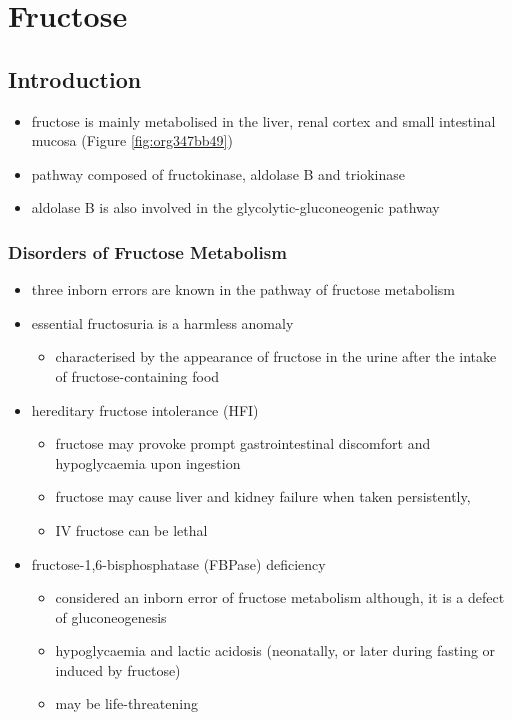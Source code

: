 \documentclass{scrartcl}
\begin{document}
\section{Fructose}
\label{sec:org1dc4e27}
\subsection{Introduction}
\label{sec:org7d9e7b2}
\begin{itemize}
\item fructose is mainly metabolised in the liver, renal cortex and small
intestinal mucosa (Figure \ref{fig:org347bb49})
\item pathway composed of fructokinase, aldolase B and triokinase
\item aldolase B is also involved in the glycolytic-gluconeogenic pathway
\end{itemize}

\subsubsection{Disorders of Fructose Metabolism}
\label{sec:orgfaa352c}
\begin{itemize}
\item three inborn errors are known in the pathway of fructose metabolism
\item essential fructosuria is a harmless anomaly
\begin{itemize}
\item characterised by the appearance of fructose in the urine after the
intake of fructose-containing food
\end{itemize}
\item hereditary fructose intolerance (HFI)
\begin{itemize}
\item fructose may provoke prompt gastrointestinal discomfort and hypoglycaemia upon ingestion
\item fructose may cause liver and kidney failure when taken persistently,
\item IV fructose can be lethal
\end{itemize}
\item fructose-1,6-bisphosphatase (FBPase) deficiency
\begin{itemize}
\item considered an inborn error of fructose metabolism although, it is
a defect of gluconeogenesis
\item hypoglycaemia and lactic acidosis (neonatally, or later during
fasting or induced by fructose)
\item may be life-threatening
\end{itemize}
\end{itemize}
\end{document}
